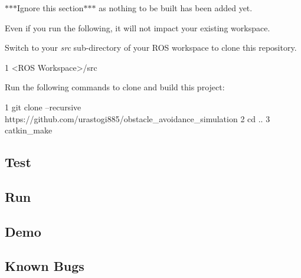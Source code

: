 \begin{DoxyItemize}
\item $\ast$$\ast$$\ast$\+Ignore this section$\ast$$\ast$$\ast$ as nothing to be built has been added yet.
\item Even if you run the following, it will not impact your existing workspace.
\item Switch to your {\itshape src} sub-\/directory of your R\+OS workspace to clone this repository. 
\begin{DoxyCode}
1 <ROS Workspace>/src
\end{DoxyCode}

\item Run the following commands to clone and build this project\+: 
\begin{DoxyCode}
1 git clone --recursive https://github.com/urastogi885/obstacle\_avoidance\_simulation
2 cd ..
3 catkin\_make
\end{DoxyCode}

\end{DoxyItemize}

\subsection*{Test}

\subsection*{Run}

\subsection*{Demo}

\subsection*{Known Bugs}